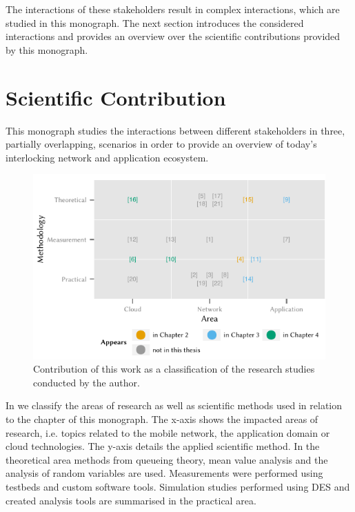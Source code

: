The interactions of these stakeholders result in complex interactions, which are studied in this monograph.
The next section introduces the considered interactions and provides an overview over the scientific contributions provided by this monograph.

\section{Scientific Contribution}\label{sec:introduction:scientific_contribution}
This monograph studies the interactions between different stakeholders in three, partially overlapping, scenarios in order to provide an overview of today's interlocking network and application ecosystem.

\begin{figure}
\centering
\includegraphics{figures/publications}
\caption{Contribution of this work as a classification of the research studies conducted by the author.}\label{fig:introduction:publications}
\end{figure}

In  we classify the areas of research as well as scientific methods used in relation to the chapter of this monograph.
The x-axis shows the impacted areas of research, i.e. topics related to the mobile network, the application domain or cloud technologies.
The y-axis details the applied scientific method.
In the theoretical area methods from queueing theory, mean value analysis and the analysis of random variables are used.
Measurements were performed using testbeds and custom software tools.
Simulation studies performed using \gls{DES} and created analysis tools are summarised in the practical area.


